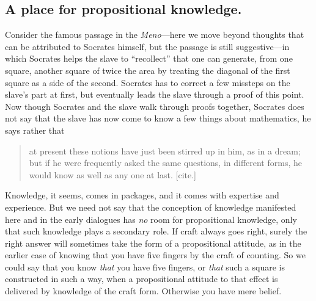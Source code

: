 \documentclass[11pt]{amsart}
\begin{document}
\subsection{A place for propositional knowledge.} Consider the famous
passage in the \emph{Meno}---here we move beyond thoughts that can be
attributed to Socrates himself, but the passage is still
suggestive---in which Socrates helps the slave to ``recollect'' that
one can generate, from one square, another square of twice the area by
treating the diagonal of the first square as a side of the second.
Socrates has to correct a few missteps on the slave's part at first,
but eventually leads the slave through a proof of this point. Now
though Socrates and the slave walk through proofs together, Socrates
does not say that the slave has now come to know a few things about
mathematics, he says rather that\begin{quote}at present these notions
have just been stirred up in him, as in a dream; but if he were
frequently asked the same questions, in different forms, he would know
as well as any one at last. [cite.]\end{quote} Knowledge, it seems,
comes in packages, and it comes with expertise and experience. But we
need not say that the conception of knowledge manifested here and in
the early dialogues has \emph{no} room for propositional knowledge,
only that such knowledge plays a secondary role. If craft always goes
right, surely the right answer will sometimes take the form of a
propositional attitude, as in the earlier case of knowing that you
have five fingers by the craft of counting. So we could say that you
know \emph{that} you have five fingers, or \emph{that} such a square
is constructed in such a way, when a propositional attitude to that
effect is delivered by knowledge of the craft form. Otherwise you have
mere belief.
\end{document}
